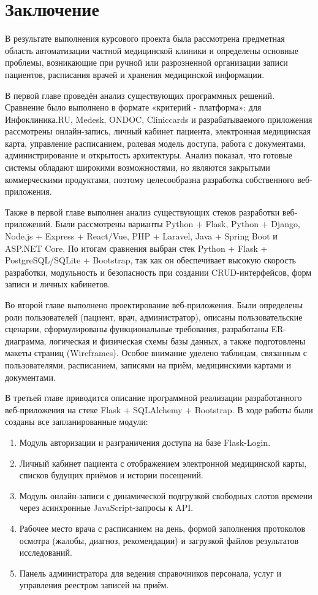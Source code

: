 
\section*{Заключение}

В результате выполнения курсового проекта была рассмотрена предметная область автоматизации частной медицинской клиники и определены основные проблемы, возникающие при ручной или разрозненной организации записи пациентов, расписания врачей и хранения медицинской информации.

В первой главе проведён анализ существующих программных решений. Сравнение было выполнено в формате «критерий - платформа»: для Инфоклиника.RU, Medesk, ONDOC, Cliniccards и разрабатываемого приложения рассмотрены онлайн-запись, личный кабинет пациента, электронная медицинская карта, управление расписанием, ролевая модель доступа, работа с документами, администрирование и открытость архитектуры. Анализ показал, что готовые системы обладают широкими возможностями, но являются закрытыми коммерческими продуктами, поэтому целесообразна разработка собственного веб-приложения.

Также в первой главе выполнен анализ существующих стеков разработки веб-приложений. Были рассмотрены варианты Python + Flask, Python + Django, Node.js + Express + React/Vue, PHP + Laravel, Java + Spring Boot и ASP.NET Core. По итогам сравнения выбран стек Python + Flask + PostgreSQL/SQLite + Bootstrap, так как он обеспечивает высокую скорость разработки, модульность и безопасность при создании CRUD-интерфейсов, форм записи и личных кабинетов.

Во второй главе выполнено проектирование веб-приложения. Были определены роли пользователей (пациент, врач, администратор), описаны пользовательские сценарии, сформулированы функциональные требования, разработаны ER-диаграмма, логическая и физическая схемы базы данных, а также подготовлены макеты страниц (Wireframes). Особое внимание уделено таблицам, связанным с пользователями, расписанием, записями на приём, медицинскими картами и документами.

В третьей главе приводится описание программной реализации разработанного веб-приложения на стеке Flask + SQLAlchemy + Bootstrap. В ходе работы были созданы все запланированные модули:
\begin{enumerate}
    \item Модуль авторизации и разграничения доступа на базе Flask-Login.
    \item Личный кабинет пациента с отображением электронной медицинской карты, списков будущих приёмов и истории посещений.
    \item Модуль онлайн-записи с динамической подгрузкой свободных слотов времени через асинхронные JavaScript-запросы к API.
    \item Рабочее место врача с расписанием на день, формой заполнения протоколов осмотра (жалобы, диагноз, рекомендации) и загрузкой файлов результатов исследований.
    \item Панель администратора для ведения справочников персонала, услуг и управления реестром записей на приём.
\end{enumerate}

